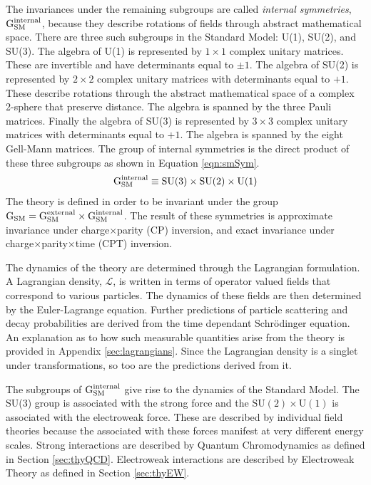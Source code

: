 The invariances under the remaining subgroups are called \emph{internal symmetries}, $\text{G}_\text{SM}^\text{internal}$, because they describe rotations of fields through abstract mathematical space.
There are three such subgroups in the Standard Model: U(1), SU(2), and SU(3).
The algebra of U(1) is represented by $1\times1$ complex unitary matrices.
These are invertible and have determinants equal to $\pm1$.
The algebra of SU(2) is represented by $2\times2$ complex unitary matrices with determinants equal to $+1$.
These describe rotations through the abstract mathematical space of a complex 2-sphere that preserve distance.
The algebra is spanned by the three Pauli matrices.
Finally the algebra of SU(3) is represented by $3\times3$ complex unitary matrices with determinants equal to $+1$.
The algebra is spanned by the eight Gell-Mann matrices.
The group of internal symmetries is the direct product of these three subgroups as shown in Equation \ref{eqn:smSym}.
\begin{equation}\begin{split}\label{eqn:smSym}
    \text{G}_\text{SM}^\text{internal}\equiv\text{SU}(3)\times\text{SU}(2)\times\text{U}(1)
\end{split}\end{equation} 
The theory is defined in order to be invariant under the group $\text{G}_\text{SM}=\text{G}_\text{SM}^\text{external}\times\text{G}_\text{SM}^\text{internal}$.
The result of these symmetries is approximate invariance under charge$\times$parity (CP) inversion, and exact invariance under charge$\times$parity$\times$time (CPT) inversion.

The dynamics of the theory are determined through the Lagrangian formulation. 
A Lagrangian density, $\mathcal{L}$, is written in terms of operator valued fields that correspond to various particles.
The dynamics of these fields are then determined by the Euler-Lagrange equation.
Further predictions of particle scattering and decay probabilities are derived from the time dependant Schr{\"o}dinger equation.
An explanation as to how such measurable quantities arise from the theory is provided in Appendix \ref{sec:lagrangians}.
Since the Lagrangian density is a singlet under \gsm transformations, so too are the predictions derived from it.

The subgroups of $\text{G}_\text{SM}^\text{internal}$ give rise to the dynamics of the Standard Model.
The SU(3) group is associated with the strong force and the $\text{SU}(2)\times\text{U}(1)$ is associated with the electroweak force.
These are described by individual field theories because the associated with these forces manifest at very different energy scales.
Strong interactions are described by Quantum Chromodynamics as defined in Section \ref{sec:thyQCD}.
Electroweak interactions are described by Electroweak Theory as defined in Section \ref{sec:thyEW}.

